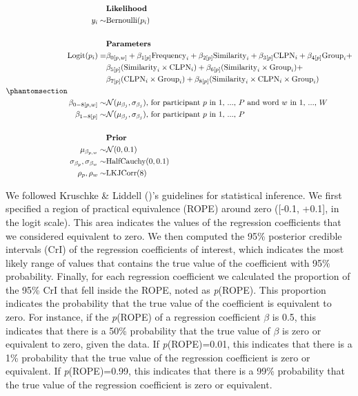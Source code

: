 \documentclass[
]{article}
\begin{document}
\begin{equation}\phantomsection\label{eq-1}{
\begin{aligned}
&\textbf{Likelihood}  \\
y_{i} \sim & \text{Bernoulli}(p_{i}) \\ \\
&\textbf{Parameters}  \\
\text{Logit}(p_{i}) = &  \beta_{0[p,w]} + \beta_{1[p]} \text{Frequency}_{i} + \beta_{2[p]} \text{Similarity}_i +  \beta_{3[p]} \text{CLPN}_i + \beta_{4[p]} \text{Group}_i + \\
&\beta_{5[p]} (\text{Similarity}_i \times \text{CLPN}_i) + \beta_{6[p]} (\text{Similarity}_i \times \text{Group}_i) + \\
& \beta_{7[p]} (\text{CLPN}_i \times \text{Group}_i) + \beta_{8[p]} (\text{Similarity}_i \times \text{CLPN}_i \times \text{Group}_i) \\ \\
\beta_{0-8[p,w]} \sim & \mathcal{N}(\mu_{\beta_{j}}, \sigma_{\beta_{j}}) \text{, for participant } p \text{ in 1, ..., } P \text{ and  word } w \text{ in 1, ..., } W \\
\beta_{1-8[p]} \sim &  \mathcal{N}(\mu_{\beta_{j}}, \sigma_{\beta_{j}}) \text{, for participant } p \text{ in 1, ..., } P \\ \\
&\textbf{Prior}  \\
\mu_{\beta_{p,w}}  \sim &  \mathcal{N}(0, 0.1) \\
\sigma_{\beta_{p}},  \sigma_{\beta_{w}} \sim & \text{HalfCauchy}(0, 0.1) \\
\rho_{p}, \rho_{w} \sim & \text{LKJCorr}(8) \\
\end{aligned}
}\end{equation}

We followed Kruschke \& Liddell
()'s guidelines for statistical
inference. We first specified a region of practical equivalence (ROPE)
around zero ({[}-0.1, +0.1{]}, in the logit scale). This area indicates
the values of the regression coefficients that we considered equivalent
to zero. We then computed the 95\% posterior credible intervals (CrI) of
the regression coefficients of interest, which indicates the most likely
range of values that contains the true value of the coefficient with
95\% probability. Finally, for each regression coefficient we calculated
the proportion of the 95\% CrI that fell inside the ROPE, noted as
\emph{p}(ROPE). This proportion indicates the probability that the true
value of the coefficient is equivalent to zero. For instance, if the
\emph{p}(ROPE) of a regression coefficient \(\beta\) is 0.5, this
indicates that there is a 50\% probability that the true value of
\(\beta\) is zero or equivalent to zero, given the data. If
\emph{p}(ROPE)=0.01, this indicates that there is a 1\% probability that
the true value of the regression coefficient is zero or equivalent. If
\emph{p}(ROPE)=0.99, this indicates that there is a 99\% probability
that the true value of the regression coefficient is zero or equivalent.
\end{document}
